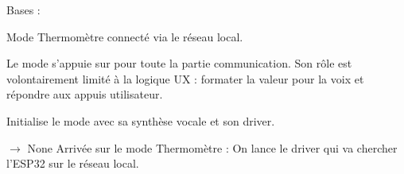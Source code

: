 \documentclass[letterpaper,10pt,french]{sphinxmanual}
\begin{document}
\begin{fulllineitems}
\label{\detokenize{api/modes:modes.mode_thermometer.ModeThermometre}}
\pysigstartsignatures
\pysiglinewithargsret
{}
{}
{}
\pysigstopsignatures
\sphinxAtStartPar
Bases : {\hyperref[\detokenize{api/core:core.mode_base.Mode}]{}}

\sphinxAtStartPar
Mode Thermomètre connecté via le réseau local.

\sphinxAtStartPar
Le mode s’appuie sur  pour toute la partie
communication. Son rôle est volontairement limité à la logique UX :
formater la valeur pour la voix et répondre aux appuis utilisateur.

\begin{fulllineitems}
\label{\detokenize{api/modes:modes.mode_thermometer.ModeThermometre.__init__}}
\pysigstartsignatures
\pysiglinewithargsret
{}
{}
{}
\pysigstopsignatures
\sphinxAtStartPar
Initialise le mode avec sa synthèse vocale et son driver.

\end{fulllineitems}


\begin{fulllineitems}
\label{\detokenize{api/modes:modes.mode_thermometer.ModeThermometre.on_enter}}
\pysigstartsignatures
\pysiglinewithargsret
{}
{}
{{ $\rightarrow$ None}}
\pysigstopsignatures
\sphinxAtStartPar
Arrivée sur le mode Thermomètre :
On lance le driver qui va chercher l’ESP32 sur le réseau local.

\end{fulllineitems}


\end{fulllineitems}
\end{document}
